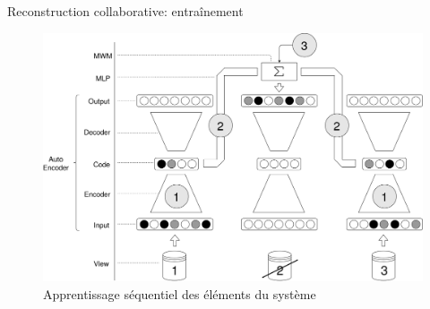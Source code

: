 \documentclass[hyperref={pdfpagelabels=false}]{beamer}
\begin{document}
    \begin{frame}{Reconstruction collaborative: entraînement}
        \begin{figure}[h]
            \centering
            \includegraphics[scale=.10]{sequence}
            \caption{Apprentissage séquentiel des éléments du système}
        \end{figure}
    \end{frame}
\end{document}
